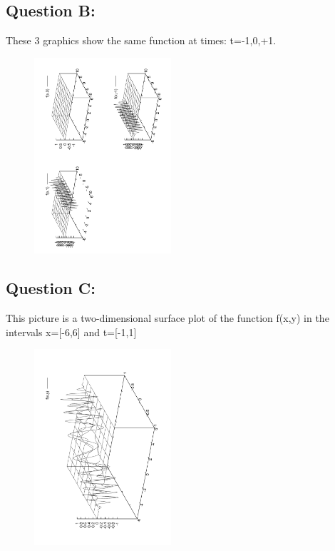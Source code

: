 \documentclass[twocolumn]{article}
\begin{document}
\subsection{Question B:}
These 3 graphics show the same function at times: t=-1,0,+1.
\begin{figure}[h!]

\begin{center}
\includegraphics[width=2in,angle=270]{b.pdf}
\label{fig2}
\end{center}

\end{figure}


\newpage


\subsection{Question C:}
This picture is a two-dimensional surface plot of the function f(x,y) in the intervals x=[-6,6] and t=[-1,1]
\begin{figure}[h!]

\begin{center}
\includegraphics[width=2in,angle=270]{c.pdf}
\label{fig3}
\end{center}

\end{figure}
\end{document}
